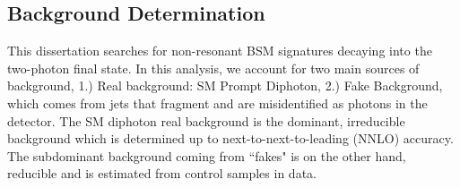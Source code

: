 
\subsection{Background Determination}

This dissertation searches for non-resonant BSM signatures decaying into the two-photon final state. In this analysis, we account for two main sources of background, 1.) Real background: SM Prompt Diphoton, 2.) Fake Background, which comes from jets that fragment and are misidentified as photons in the detector. The SM diphoton real background is the dominant, irreducible background which is determined up to next-to-next-to-leading (NNLO) accuracy. The subdominant background coming from ``fakes" is on the other hand, reducible and is estimated from control samples in data. 






